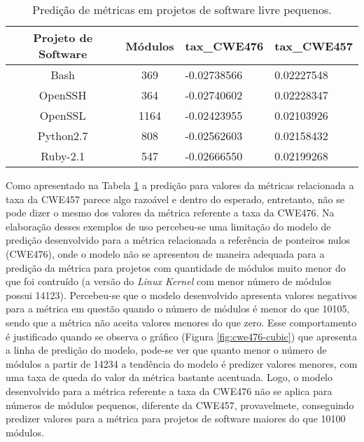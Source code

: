\begin{table}[h]
 \centering
 \begin{tabular}{ccll}
  \hline
  \rowcolor[HTML]{EFEFEF} 
  Projeto de Software & Módulos &
  \multicolumn{1}{c}{\cellcolor[HTML]{EFEFEF}tax\_CWE476} &
  \multicolumn{1}{c}{\cellcolor[HTML]{EFEFEF}tax\_CWE457} \\ \hline
  Bash                & 369     & -0.02738566
  & 0.02227548                                              \\ \hline
  OpenSSH             & 364     & -0.02740602
  & 0.02228347                                              \\ \hline
  OpenSSL             & 1164    & -0.02423955
  & 0.02103926                                              \\ \hline
  Python2.7           & 808     & -0.02562603
  & 0.02158432                                              \\ \hline
  Ruby-2.1            & 547     & -0.02666550
  & 0.02199268                                             \\ \hline
 \end{tabular}
 \caption{Predição de métricas em projetos de software livre pequenos.}
 \label{tab:exemplos}
\end{table}


Como apresentado na Tabela \ref{tab:exemplos} a predição para valores da
métricas relacionada a taxa da CWE457 parece algo razoável e dentro do esperado,
entretanto, não se pode dizer o mesmo dos valores da métrica referente a taxa da
CWE476. Na elaboração desses exemplos de uso percebeu-se uma limitação do
modelo de predição desenvolvido para a métrica relacionada a referência de
ponteiros nulos (CWE476), onde o modelo não se apresentou de maneira adequada
para a predição da métrica para projetos com quantidade de módulos muito menor
do que foi contruído (a versão do \textit{Linux Kernel} com menor número de
módulos possui 14123). Percebeu-se que o modelo desenvolvido apresenta valores
negativos para a métrica em questão quando o número de módulos é menor do que
10105, sendo que a métrica não aceita valores menores do que zero. Esse
comportamento é justificado quando se observa o gráfico (Figura
\ref{fig:cwe476-cubic}) que apresenta a linha de predição do modelo, pode-se ver
que quanto menor o número de módulos a partir de 14234 a tendência do modelo é
predizer valores menores, com uma taxa de queda do valor da métrica bastante
acentuada. Logo, o modelo desenvolvido para a métrica referente a taxa da CWE476
não se aplica para números de módulos pequenos, diferente da CWE457,
provavelmete, conseguindo predizer valores para a métrica para projetos de
software maiores do que 10100 módulos.

